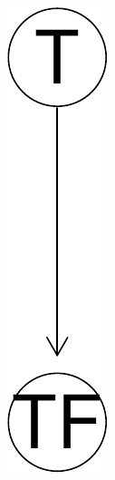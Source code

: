 \documentclass[
  10pt,
]{scrartcl}
\begin{document}
\begin{figure}[H]
{\begin{subfigure}[!ht]{0.3\textwidth}
\begin{center}\includegraphics[width=1\linewidth]{coherencePaper40_files/figure-latex/TwoDiceDAG2-1} \end{center}
\end{subfigure}}
\end{figure}
\end{document}
